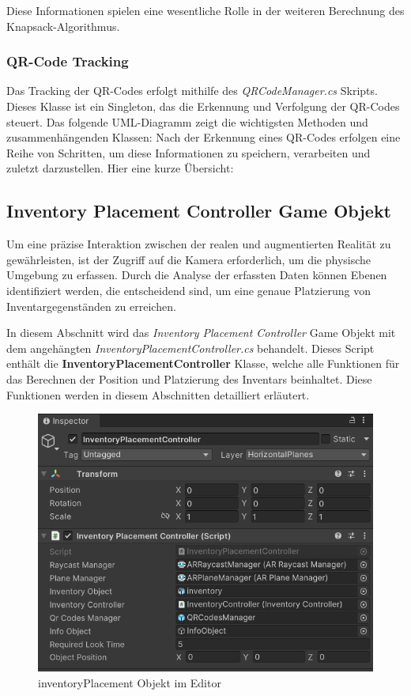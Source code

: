Diese Informationen spielen eine wesentliche Rolle in der weiteren Berechnung des Knapsack-Algorithmus.

\subsubsection{QR-Code Tracking}
Das Tracking der QR-Codes erfolgt mithilfe des \textit{QRCodeManager.cs} Skripts. Dieses Klasse ist ein Singleton, das
die Erkennung und Verfolgung der QR-Codes steuert.
Das folgende UML-Diagramm zeigt die wichtigsten Methoden und zusammenhängenden Klassen:
Nach der Erkennung eines QR-Codes erfolgen eine Reihe von Schritten, um diese Informationen zu speichern, verarbeiten
und zuletzt darzustellen.
Hier eine kurze Übersicht:

\subsection{Inventory Placement Controller Game Objekt}
Um eine präzise Interaktion zwischen der realen und augmentierten Realität zu gewährleisten, ist der Zugriff auf die
Kamera erforderlich, um die physische Umgebung zu erfassen. Durch die Analyse der erfassten Daten können Ebenen
identifiziert werden, die entscheidend sind, um eine genaue Platzierung von Inventargegenständen zu erreichen.

In diesem Abschnitt wird das \textit{Inventory Placement Controller} Game Objekt mit dem angehängten \textit{InventoryPlacementController.cs}
behandelt. Dieses Script enthält die \textbf{InventoryPlacementController} Klasse, welche alle Funktionen für das Berechnen
der Position und Platzierung des Inventars beinhaltet. Diese Funktionen werden in diesem Abschnitten detailliert erläutert.

\begin{figure}[h]
    \centering
    \includegraphics[scale=0.8]{images/invPlace_Editor}
    \caption{inventoryPlacement Objekt im Editor}
    \label{fig:inventoryPlacementController_Editor}
\end{figure}

